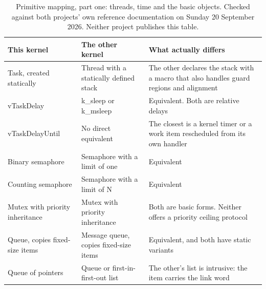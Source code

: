 \begin{steps}
\begin{table}[H]\centering\small
\begin{tabular}{p{38mm}p{38mm}p{76mm}}
\toprule
This kernel & The other kernel & What actually differs \\
\midrule
Task, created statically & Thread with a statically defined stack & The other declares the stack with a macro that also handles guard regions and alignment \\
vTaskDelay & k\_sleep or k\_msleep & Equivalent. Both are relative delays \\
vTaskDelayUntil & No direct equivalent & The closest is a kernel timer or a work item rescheduled from its own handler \\
Binary semaphore & Semaphore with a limit of one & Equivalent \\
Counting semaphore & Semaphore with a limit of N & Equivalent \\
Mutex with priority inheritance & Mutex with priority inheritance & Both are basic forms. Neither offers a priority ceiling protocol \\
Queue, copies fixed-size items & Message queue, copies fixed-size items & Equivalent, and both have static variants \\
Queue of pointers & Queue or first-in-first-out list & The other's list is intrusive: the item carries the link word \\
\bottomrule
\end{tabular}
\caption{Primitive mapping, part one: threads, time and the basic objects. Checked against both projects' own reference documentation on Sunday 20 September 2026. Neither project publishes this table.}
\end{table}


\end{steps}
